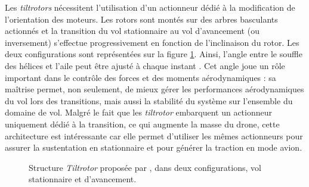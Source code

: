         Les \textit{tiltrotors} nécessitent l'utilisation d'un actionneur dédié à la modification de l'orientation des moteurs. Les rotors sont montés sur des arbres basculants actionnés et la transition du vol stationnaire au vol d'avancement (ou inversement) s'effectue progressivement en fonction de l'inclinaison du rotor. Les deux configurations sont représentées sur la figure \ref{fig:tiltrotor}. Ainsi, l'angle entre le souffle des hélices et l'aile peut être ajusté à chaque instant \cite{9836063, du2024numerical, nie2024hierarchical, schlatter2024longitudinal}. Cet angle joue un rôle important dans le contrôle des forces et des moments aérodynamiques : sa maîtrise permet, non seulement, de mieux gérer les performances aérodynamiques du vol lors des transitions, mais aussi la stabilité du système sur l'ensemble du domaine de vol. 
        Malgré le fait que les \textit{tiltrotor} embarquent un actionneur uniquement dédié à la transition, ce qui augmente la masse du drone, cette architecture est intéressante car elle permet d'utiliser les mêmes actionneurs pour assurer la sustentation en stationnaire et pour générer la traction en mode avion.
        \begin{figure}[ht!]
            \centering
            \caption{Structure \textit{Tiltrotor}  proposée par \cite{7040348}, dans deux configurations, vol stationnaire et d'avancement.}
            \label{fig:tiltrotor}
        \end{figure}


        

